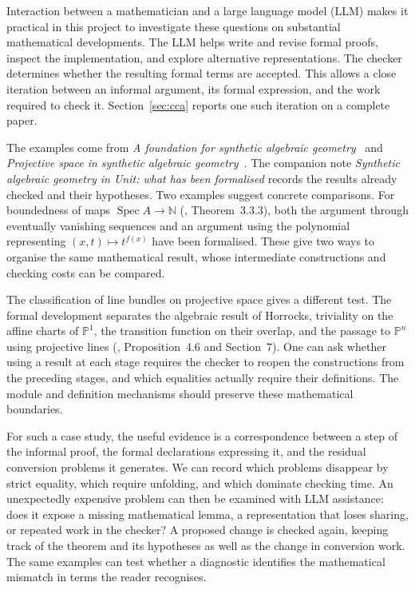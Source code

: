 \documentclass[11pt]{article}
\theoremstyle{remark}
\begin{document}
Interaction between a mathematician and a large language model (LLM)
makes it practical in this project to investigate these questions on
substantial mathematical developments. The LLM helps write and revise
formal proofs, inspect the implementation, and explore alternative
representations. The checker determines whether the resulting formal
terms are accepted. This allows a close iteration between an informal
argument, its formal expression, and the work required to check it.
Section~\ref{sec:cca} reports one such iteration on a complete paper.

The examples come from \emph{A foundation for synthetic algebraic
geometry}~\cite{SAG} and \emph{Projective space in synthetic algebraic
geometry}~\cite{Proj}. The companion note \emph{Synthetic algebraic
geometry in Unit: what has been formalised} records the results already
checked and their hypotheses. Two examples suggest concrete comparisons.
For boundedness of maps $\operatorname{Spec} A\to\mathbb N$
(\cite{SAG}, Theorem~3.3.3), both the argument through eventually
vanishing sequences and an argument using the polynomial representing
$(x,t)\mapsto t^{f(x)}$ have been formalised. These give two ways to
organise the same mathematical result, whose intermediate constructions
and checking costs can be compared.

The classification of line bundles on projective space gives a different
test. The formal development separates the algebraic result of Horrocks,
triviality on the affine charts of $\mathbb P^1$, the transition function
on their overlap, and the passage to $\mathbb P^n$ using projective lines
(\cite{Proj}, Proposition~4.6 and Section~7). One can ask whether using a
result at each stage requires the checker to reopen the constructions
from the preceding stages, and which equalities actually require their
definitions. The module and definition mechanisms should preserve these
mathematical boundaries.

For such a case study, the useful evidence is a correspondence between
a step of the informal proof, the formal declarations expressing it, and
the residual conversion problems it generates. We can record which
problems disappear by strict equality, which require unfolding, and which
dominate checking time. An unexpectedly expensive problem can then be
examined with LLM assistance: does it expose a missing mathematical lemma,
a representation that loses sharing, or repeated work in the checker?
A proposed change is checked again, keeping track of the theorem and its
hypotheses as well as the change in conversion work. The same examples
can test whether a diagnostic identifies the mathematical mismatch in
terms the reader recognises.
\end{document}
